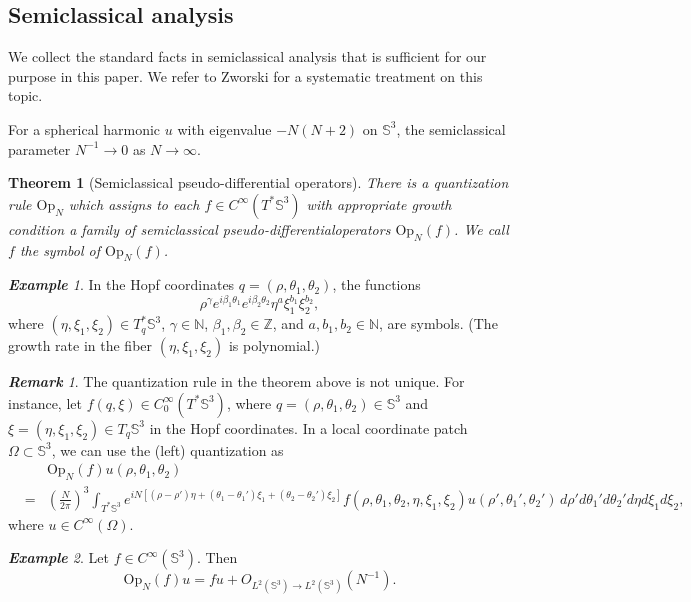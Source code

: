 \documentclass[12pt,reqno]{amsart}
\newcommand\N{\mathbb{N}}
\newcommand\Op{\mathrm{Op}}
\newcommand\Sb{\mathbb{S}}
\newcommand\Z{\mathbb{Z}}
\theoremstyle{plain}
\newtheorem{thm}{Theorem}
\theoremstyle{remark}
\newtheorem*{ex}{\textbf{Example}}
\newtheorem*{rmk}{\textbf{Remark}}
\numberwithin{equation}{section}
\begin{document}
\subsection{Semiclassical analysis}\label{sec:sc}
We collect the standard facts in semiclassical analysis that is sufficient for our purpose in this paper. We refer to Zworski \cite[Chapter 14]{Zw} for a systematic treatment on this topic.

For a spherical harmonic $u$ with eigenvalue $-N(N+2)$ on $\Sb^3$, the semiclassical parameter $N^{-1}\to0$ as $N\to\infty$. 

\begin{thm}[Semiclassical pseudo-differential operators]
There is a quantization rule $\Op_N$ which assigns to each $f\in C^\infty(T^*\Sb^3)$ with appropriate growth condition a family of semiclassical pseudo-differentialoperators $\Op_N(f)$. We call $f$ the symbol of $\Op_N(f)$.
\end{thm}

\begin{ex}
In the Hopf coordinates $q=(\rho,\theta_1,\theta_2)$, the functions 
$$\rho^\gamma e^{i\beta_1\theta_1}e^{i\beta_2\theta_2}\eta^a\xi_1^{b_1}\xi_2^{b_2},$$ 
where $(\eta,\xi_1,\xi_2)\in T^*_q\Sb^3$, $\gamma\in\N$, $\beta_1,\beta_2\in\Z$, and $a,b_1,b_2\in\N$, are symbols. (The growth rate in the fiber $(\eta,\xi_1,\xi_2)$ is polynomial.)
\end{ex}

\begin{rmk}
The quantization rule in the theorem above is not unique. For instance, let $f(q,\xi)\in C^\infty_0(T^*\Sb^3)$, where $q=(\rho,\theta_1,\theta_2)\in\Sb^3$ and $\xi=(\eta,\xi_1,\xi_2)\in T_q\Sb^3$ in the Hopf coordinates. In a local coordinate patch $\Omega\subset\Sb^3$, we can use the (left) quantization as
\begin{eqnarray*}
&&\Op_N(f)u\left(\rho,\theta_1,\theta_2\right)\\
&=&\left(\frac{N}{2\pi}\right)^3\int_{T^*\Sb^3}e^{iN\left[(\rho-\rho')\eta+\left(\theta_1-\theta_1'\right)\xi_1+\left(\theta_2-\theta_2'\right)\xi_2\right]}f\left(\rho,\theta_1,\theta_2,\eta,\xi_1,\xi_2\right)u\left(\rho',\theta_1',\theta_2'\right)\,d\rho'd\theta_1'd\theta_2'd\eta d\xi_1d\xi_2,
\end{eqnarray*}
where $u\in C^\infty(\Omega)$.
\end{rmk}

\begin{ex}
Let $f\in C^\infty(\Sb^3)$. Then 
$$\Op_N(f)u=fu+O_{L^2(\Sb^3)\to L^2(\Sb^3)}\left(N^{-1}\right).$$
\end{ex}
\end{document}

